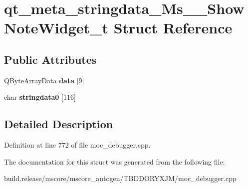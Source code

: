 \hypertarget{structqt__meta__stringdata___ms_____show_note_widget__t}{}\section{qt\+\_\+meta\+\_\+stringdata\+\_\+\+Ms\+\_\+\+\_\+\+Show\+Note\+Widget\+\_\+t Struct Reference}
\label{structqt__meta__stringdata___ms_____show_note_widget__t}
\subsection*{Public Attributes}
\begin{DoxyCompactItemize}
\item 
\mbox{\label{structqt__meta__stringdata___ms_____show_note_widget__t_ac4e9aedbfd9f9ec77b2a92ffdf7225e8}} 
Q\+Byte\+Array\+Data {\bfseries data} \mbox{[}9\mbox{]}
\item 
\mbox{\label{structqt__meta__stringdata___ms_____show_note_widget__t_ae2d2ccbac2be45957dda3defcc1d02cb}} 
char {\bfseries stringdata0} \mbox{[}116\mbox{]}
\end{DoxyCompactItemize}


\subsection{Detailed Description}


Definition at line 772 of file moc\+\_\+debugger.\+cpp.



The documentation for this struct was generated from the following file\+:\begin{DoxyCompactItemize}
\item 
build.\+release/mscore/mscore\+\_\+autogen/\+T\+B\+D\+D\+O\+R\+Y\+X\+J\+M/moc\+\_\+debugger.\+cpp\end{DoxyCompactItemize}
